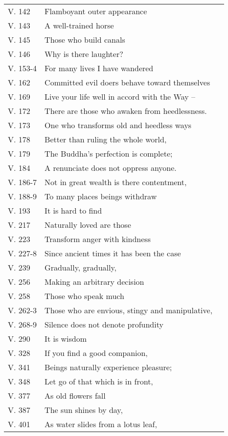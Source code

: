 {\begin{longtable}[c]{llr}
V. 142 & Flamboyant outer appearance & \pageref{dhp-142}\\
V. 143 & A well-trained horse & \pageref{dhp-143}\\
V. 145 & Those who build canals & \pageref{dhp-145}\\
V. 146 & Why is there laughter? & \pageref{dhp-146}\\
V. 153-4 & For many lives I have wandered & \pageref{dhp-153}\\
V. 162 & Committed evil doers behave toward themselves & \pageref{dhp-162}\\
V. 169 & Live your life well in accord with the Way -- & \pageref{dhp-169}\\
V. 172 & There are those who awaken from heedlessness. & \pageref{dhp-172}\\
V. 173 & One who transforms old and heedless ways & \pageref{dhp-173}\\
V. 178 & Better than ruling the whole world, & \pageref{dhp-178}\\
V. 179 & The Buddha's perfection is complete; & \pageref{dhp-179}\\
V. 184 & A renunciate does not oppress anyone. & \pageref{dhp-184}\\
V. 186-7 & Not in great wealth is there contentment, & \pageref{dhp-186}\\
V. 188-9 & To many places beings withdraw & \pageref{dhp-188}\\
V. 193 & It is hard to find & \pageref{dhp-193}\\
V. 217 & Naturally loved are those & \pageref{dhp-217}\\
V. 223 & Transform anger with kindness & \pageref{dhp-223}\\
V. 227-8 & Since ancient times it has been the case & \pageref{dhp-227}\\
V. 239 & Gradually, gradually, & \pageref{dhp-239}\\
V. 256 & Making an arbitrary decision & \pageref{dhp-256}\\
V. 258 & Those who speak much & \pageref{dhp-258}\\
V. 262-3 & Those who are envious, stingy and manipulative, & \pageref{dhp-262}\\
V. 268-9 & Silence does not denote profundity & \pageref{dhp-268}\\
V. 290 & It is wisdom & \pageref{dhp-290}\\
V. 328 & If you find a good companion, & \pageref{dhp-328}\\
V. 341 & Beings naturally experience pleasure; & \pageref{dhp-341}\\
V. 348 & Let go of that which is in front, & \pageref{dhp-348}\\
V. 377 & As old flowers fall & \pageref{dhp-377}\\
V. 387 & The sun shines by day, & \pageref{dhp-387}\\
V. 401 & As water slides from a lotus leaf, & \pageref{dhp-401}\\
\end{longtable}

}

